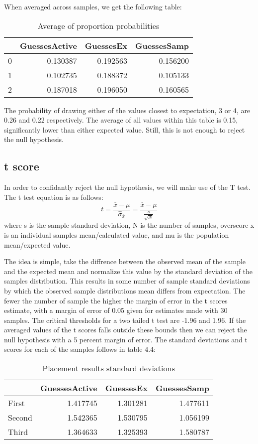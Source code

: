 When averaged across samples, we get the following table:

\begin{table}
\begin{tabular}{lrrr}
\toprule
{} &  GuessesActive &  GuessesEx &  GuessesSamp \\
\midrule
0 &       0.130387 &   0.192563 &     0.156200 \\
1 &       0.102735 &   0.188372 &     0.105133 \\
2 &       0.187018 &   0.196050 &     0.160565 \\
\bottomrule
\end{tabular}
\caption{Average of proportion probabilities}
\end{table}

The probability of drawing either of the values closest to expectation, 3 or 4,
are 0.26 and 0.22 respectively. The average of all values within this table is
0.15, significantly lower than either expected value. Still, this is not enough
to reject the null hypothesis.

\subsection{t score}
In order to confidantly reject the null hypothesis, we will make use of the
T test.  The t test equation is as follows:
$$t =\frac{\overline{x}-\mu}{\hat{\sigma}_{\overline{x}}} = \frac{\overline{x}-\mu}{\frac{s}{\sqrt{N}}}$$
where s is the sample standard deviation, N is the
number of samples, overscore x is an individual samples mean/calculated value,
and mu is the population mean/expected value.

The idea is simple, take the diffrence between the observed mean of the sample
and the expected mean and normalize this value by the standard deviation of the
samples distribution. This results in some number of sample standard deviations
by which the observed sample distributions mean differs from expectation. The
fewer the number of sample the higher the margin of error in the t scores
estimate, with a margin of error of 0.05 given for estimates made with 30
samples. The critical thresholds for a two tailed t test are -1.96 and 1.96.
If the averaged values of the t scores falls outside these bounds then we can
reject the null hypothesis with a 5 percent margin of error. The standard
deviations and t scores for each of the samples follows in table 4.4:

\begin{table}
\begin{tabular}{lrrr}
\toprule
{} &  GuessesActive &  GuessesEx &  GuessesSamp \\
\midrule
First &       1.417745 &   1.301281 &     1.477611 \\
Second &       1.542365 &   1.530795 &     1.056199 \\
Third &       1.364633 &   1.325393 &     1.580787 \\
\bottomrule
\end{tabular}
\caption{Placement results standard deviations}
\end{table}


